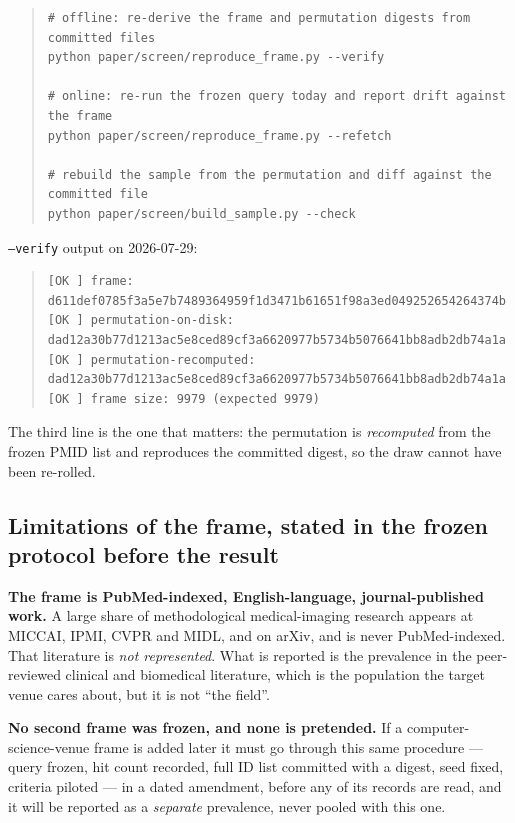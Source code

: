 \documentclass[11pt,a4paper]{article}
\begin{document}
\begin{quote}\small
\begin{verbatim}
# offline: re-derive the frame and permutation digests from committed files
python paper/screen/reproduce_frame.py --verify

# online: re-run the frozen query today and report drift against the frame
python paper/screen/reproduce_frame.py --refetch

# rebuild the sample from the permutation and diff against the committed file
python paper/screen/build_sample.py --check
\end{verbatim}
\end{quote}

\noindent \texttt{--verify} output on 2026-07-29:

\begin{quote}\scriptsize
\begin{verbatim}
[OK ] frame: d611def0785f3a5e7b7489364959f1d3471b61651f98a3ed049252654264374b
[OK ] permutation-on-disk: dad12a30b77d1213ac5e8ced89cf3a6620977b5734b5076641bb8adb2db74a1a
[OK ] permutation-recomputed: dad12a30b77d1213ac5e8ced89cf3a6620977b5734b5076641bb8adb2db74a1a
[OK ] frame size: 9979 (expected 9979)
\end{verbatim}
\end{quote}

The third line is the one that matters: the permutation is \emph{recomputed} from the
frozen PMID list and reproduces the committed digest, so the draw cannot have been
re-rolled.

\subsection{Limitations of the frame, stated in the frozen protocol before the result}

\textbf{The frame is PubMed-indexed, English-language, journal-published work.} A
large share of methodological medical-imaging research appears at MICCAI, IPMI, CVPR
and MIDL, and on arXiv, and is never PubMed-indexed. That literature is \emph{not
represented}. What is reported is the prevalence in the peer-reviewed
clinical and biomedical literature, which is the population the target venue cares
about, but it is not ``the field''.

\textbf{No second frame was frozen, and none is pretended.} If a
computer-science-venue frame is added later it must go through this same procedure
--- query frozen, hit count recorded, full ID list committed with a digest, seed
fixed, criteria piloted --- in a dated amendment, before any of its records are read,
and it will be reported as a \emph{separate} prevalence, never pooled with this one.
\end{document}
